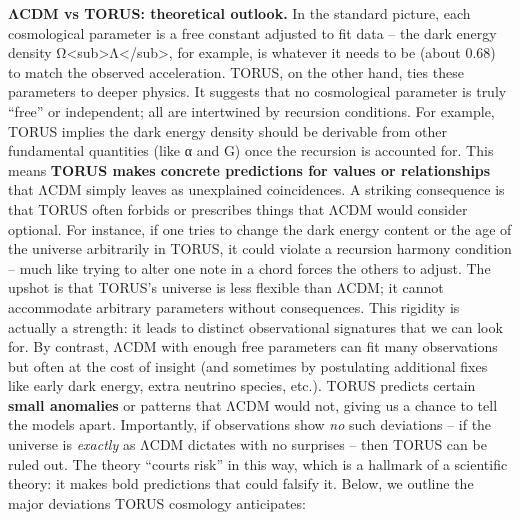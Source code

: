 \documentclass[
]{article}
\begin{document}
\textbf{ΛCDM vs TORUS: theoretical outlook.} In the standard picture,
each cosmological parameter is a free constant adjusted to fit data --
the dark energy density
Ω\textless sub\textgreater Λ\textless/sub\textgreater, for example, is
whatever it needs to be (about 0.68) to match the observed acceleration.
TORUS, on the other hand, ties these parameters to deeper physics. It
suggests that no cosmological parameter is truly ``free'' or
independent; all are intertwined by recursion conditions. For example,
TORUS implies the dark energy density should be derivable from other
fundamental quantities (like α and G) once the recursion is accounted
for\hspace{0pt}. This means \textbf{TORUS makes concrete predictions for
values or relationships} that ΛCDM simply leaves as unexplained
coincidences. A striking consequence is that TORUS often forbids or
prescribes things that ΛCDM would consider optional. For instance, if
one tries to change the dark energy content or the age of the universe
arbitrarily in TORUS, it could violate a recursion harmony condition --
much like trying to alter one note in a chord forces the others to
adjust. The upshot is that TORUS's universe is less flexible than ΛCDM;
it cannot accommodate arbitrary parameters without consequences. This
rigidity is actually a strength: it leads to distinct observational
signatures that we can look for. By contrast, ΛCDM with enough free
parameters can fit many observations but often at the cost of insight
(and sometimes by postulating additional fixes like early dark energy,
extra neutrino species, etc.). TORUS predicts certain \textbf{small
anomalies} or patterns that ΛCDM would not, giving us a chance to tell
the models apart. Importantly, if observations show \emph{no} such
deviations -- if the universe is \emph{exactly} as ΛCDM dictates with no
surprises -- then TORUS can be ruled out. The theory ``courts risk'' in
this way\hspace{0pt}, which is a hallmark of a scientific theory: it
makes bold predictions that could falsify it. Below, we outline the
major deviations TORUS cosmology anticipates:
\end{document}
